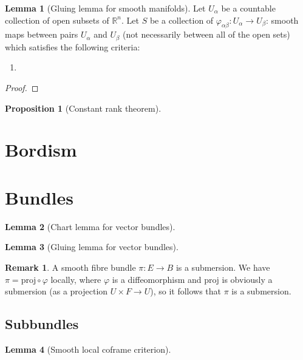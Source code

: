 \documentclass[aps,pra,showpacs,notitlepage,onecolumn,superscriptaddress,nofootinbib]{revtex4-1}
\theoremstyle{definition}
\newtheorem{lemma}{Lemma}[section]
\newtheorem{remark}{Remark}[section]
\newtheorem{prop}{Proposition}[section]
\begin{document}
\begin{lemma}[Gluing lemma for smooth manifolds]
  Let $U_{\alpha}$ be a countable collection of open subsets of $\mathbb{R}^n$. Let $S$ be a collection of $\varphi_{\alpha \beta} : U_{\alpha} \rightarrow U_{\beta}$: smooth maps
  between pairs $U_{\alpha}$ and $U_{\beta}$ (not necessarily between all of the open sets) which satisfies the following criteria:
  \begin{enumerate}
    \item 
    \end{enumerate}
  \end{lemma}
\begin{proof}
  \end{proof}

\begin{prop}[Constant rank theorem]

  \end{prop}

\section{Bordism}

\section{Bundles}

\begin{lemma}[Chart lemma for vector bundles]

  \end{lemma}

\begin{lemma}[Gluing lemma for vector bundles]
  \end{lemma}

\begin{remark}
  A smooth fibre bundle $\pi : E \rightarrow B$ is a submersion. We have $\pi = \text{proj} \circ \varphi$ locally, where $\varphi$ is a diffeomorphism and $\text{proj}$ is obviously a
  submersion (as a projection $U \times F \rightarrow U$), so it follows that $\pi$ is a submersion.
  \end{remark}

\subsection{Subbundles}

\begin{lemma}[Smooth local coframe criterion]

  \end{lemma}
\end{document}
